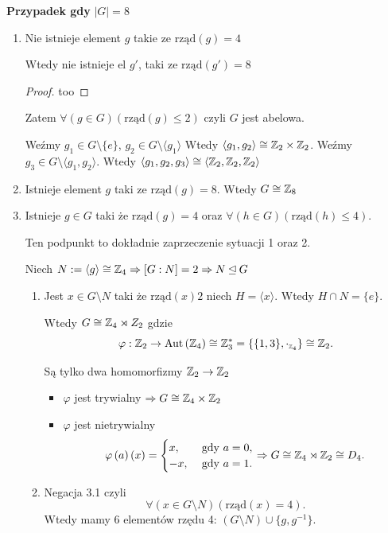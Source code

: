\textbf{Przypadek gdy} $\left| G \right| = 8$
\begin{enumerate}[label=\arabic*.]
	\item Nie istnieje element $g$ takie ze $\text{rząd}\left( g \right) =4$ 
		\begin{fact}
		Wtedy nie istnieje el $g'$, taki ze $\text{rząd}\left( g' \right) = 8$
		\end{fact}
		\begin{proof}
			too
		\end{proof} 

		Zatem $\forall\left(g\in G\right)\left( \text{rząd}\left( g \right) \le 2 \right)  $ czyli $G$ jest abelowa.

		Weźmy $g_1\in G\setminus \{e\} $, $g_2\in G\setminus \langle g_1 \rangle $ 
		Wtedy $\langle g_1,g_2 \rangle \cong \mathbb{Z}_2\times \mathbb{Z}_2$.
		Weźmy $g_3\in G\setminus \langle g_1,g_2 \rangle $. Wtedy $\langle g_1,g_2,g_3 \rangle \cong \langle \mathbb{Z}_2,\mathbb{Z}_2,\mathbb{Z}_2 \rangle $
	\item Istnieje element $g$ taki ze $\text{rząd}\left(  g\right) = 8$. Wtedy $G\cong\mathbb{Z}_8$
	\item Istnieje $g\in G$ taki że $\text{rząd}\left( g \right) = 4$ oraz $\forall\left(h\in G\right) \left( \text{rząd}\left( h \right) \le 4 \right). $ 

		Ten podpunkt to dokładnie zaprzeczenie sytuacji 1 oraz 2. 

		Niech $N:= \langle g \rangle \cong\mathbb{Z}_4 \Rightarrow [G:N] = 2 \Rightarrow N\unlhd G$
		\begin{enumerate}[label=\theenumi\arabic*., ref=\theenumi.\arabic*]
			\item Jest $x\in G\setminus N$ taki że $\text{rząd}\left( x \right) 2$
				niech $H = \langle x \rangle $. Wtedy $H\cap N = \{e\} $.

				Wtedy $G\cong\mathbb{Z}_4 \rtimes Z_2$ gdzie 
				\[
				\varphi : \mathbb{Z}_2 \to \operatorname{Aut}\left(\mathbb{Z}_4\right) \cong \mathbb{Z}_3^{*}= \{ \{1,3\} , \cdot _{\scriptscriptstyle \mathbb{Z}_4}\} \cong\mathbb{Z}_2
				.\] 

				Są tylko dwa homomorfizmy $\mathbb{Z}_2\to \mathbb{Z}_2$
				\begin{itemize}
					\item $ \varphi$ jest trywialny $\Rightarrow G \cong \mathbb{Z}_4 \times \mathbb{Z}_2$
					\item $\varphi$ jest nietrywialny
						\[
						\varphi\left( a \right) \left( x \right) = \begin{cases}
							x, &\text{ gdy } a = 0, \\
							-x, & \text{ gdy } a = 1.
						\end{cases} \Rightarrow G\cong \mathbb{Z}_4 \rtimes \mathbb{Z}_2 \cong D_{4}
						.\] 
				\end{itemize}
			\item Negacja 3.1 czyli
				\[
				\forall\left(x\in G\setminus N\right)\left( \text{rząd}\left( x \right) = 4 \right)  
				.\] 
				Wtedy mamy 6 elementów rzędu 4: $\left( G\setminus N \right) \cup \{g,g^{-1}\} $.
				

\end{enumerate}
\end{enumerate}
